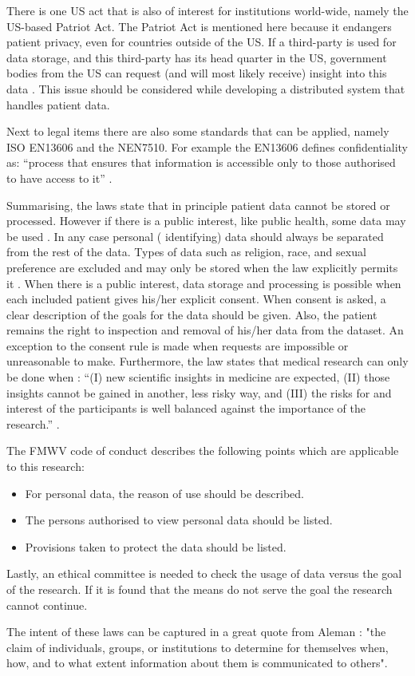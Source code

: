 There is one US act that is also of interest for institutions world-wide, namely the US-based Patriot Act.
The Patriot Act is mentioned here because it endangers patient privacy, even for countries outside of the US.
If a third-party is used for data storage, and this third-party has its head quarter in the US, government bodies from the US can request (and will most likely receive) insight into this data \cite{s7Kluge2007}.
This issue should be considered while developing a distributed system that handles patient data.

Next to legal items there are also some standards that can be applied, namely ISO EN13606 and the NEN7510.
For example the EN13606 defines confidentiality as: ``process that ensures that information is accessible only to those authorised to have access to it'' \cite{s8FernandezAleman2013}.

Summarising, the laws state that in principle patient data cannot be stored or processed.
However if there is a public interest, like public health, some data may be used \cite{s19Mouw2012}.
In any case personal (\ie{} identifying) data should always be separated from the rest of the data.
Types of data such as religion, race, and sexual preference are excluded and may only be stored when the law explicitly permits it \cite{s19Mouw2012}.
When there is a public interest, data storage and processing is possible when each included patient gives his/her explicit consent.
When consent is asked, a clear description of the goals for the data should be given.
Also, the patient remains the right to inspection and removal of his/her data from the dataset.
An exception to the consent rule is made when requests are impossible or unreasonable to make.
Furthermore, the law states that medical research can only be done when : ``(I) new scientific insights in medicine are expected, (II) those insights cannot be gained in another, less risky way, and (III) the risks for and interest of the participants is well balanced against the importance of the research.'' \cite{s19Mouw2012}.

The FMWV code of conduct describes the following points which are applicable to this research:

\begin{itemize}
	\item For personal data, the reason of use should be described.
	\item The persons authorised to view personal data should be listed.
	\item Provisions taken to protect the data should be listed.
\end{itemize}

Lastly, an ethical committee is needed to check the usage of data versus the goal of the research.
If it is found that the means do not serve the goal the research cannot continue.

The intent of these laws can be captured in a great quote from Aleman \cite{s8FernandezAleman2013}: "the claim of individuals, groups, or institutions to determine for themselves when, how, and to what extent information about them is communicated to others".